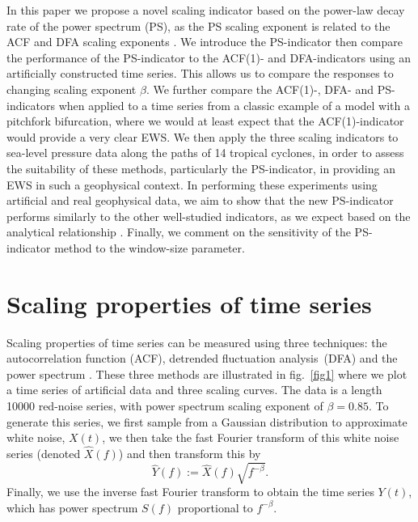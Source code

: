 \documentclass[doublecol]{epl2}
\begin{document}
In this paper we propose a novel scaling indicator based on the 
power-law decay rate of the power spectrum (PS), as the PS scaling 
exponent is related to the ACF and DFA scaling exponents 
\cite{kantelhardt2001}. We introduce the PS-indicator then compare 
the performance of the PS-indicator to the ACF(1)- and 
DFA-indicators using an artificially constructed time series. 
This allows us to compare the responses to changing 
scaling exponent $\beta$. We further compare the ACF(1)-, 
DFA- and PS-indicators when applied to a time series from a classic 
example of a model with a pitchfork bifurcation, where we would at 
least expect that the ACF(1)-indicator would provide a very clear EWS. 
We then apply the three scaling indicators to sea-level pressure 
data along the paths of 14 tropical cyclones, in order to assess 
the suitability of these methods, particularly the PS-indicator, 
in providing an EWS in such a geophysical context. 
In performing these experiments using artificial and 
real geophysical data, we aim to show that the new PS-indicator 
performs similarly to the other well-studied indicators, as we 
expect based on the analytical relationship \cite{kantelhardt2001}. 
Finally, we comment on the sensitivity of the PS-indicator method 
to the window-size parameter.

\section{Scaling properties of time series}
\label{subsec_scalingproperties}

Scaling properties of time series can be measured using three techniques: 
the autocorrelation function (ACF), detrended fluctuation analysis~(DFA) 
and the power spectrum \cite{bak1988, kantelhardt2001}. 
These three methods are illustrated in fig.~\ref{fig1} where we plot 
a time series of artificial data and three scaling curves. 
The data is a length 10000 red-noise series, with power spectrum 
scaling exponent of $\beta =0.85$. To generate this series, 
we first sample from a Gaussian distribution to approximate 
white noise, $X(t)$, we then take the fast Fourier transform 
of this white noise series (denoted $\hat{X}(f)$) and then 
transform this by  
\begin{equation} 
\hat{Y}(f) := \hat{X}(f)\sqrt{f^{-\beta}}.\label{eqn_inverse_fourier} 
\end{equation} 
Finally, we use the inverse fast Fourier transform to obtain the 
time series $Y(t)$, which has power spectrum $S(f)$ proportional 
to $f^{-\beta}$.
\end{document}
